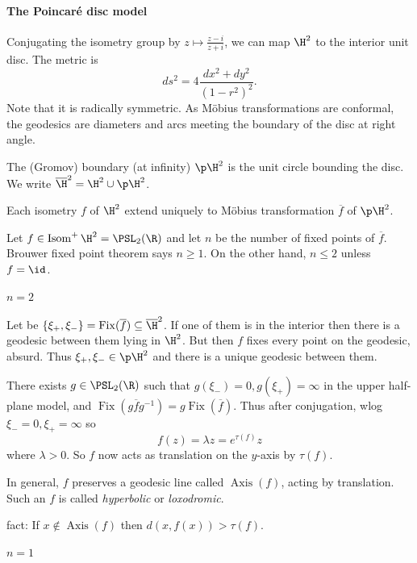 \documentclass[a4paper]{article}
\renewcommand{\b}{\p}
\DeclareMathOperator{\Isom}{Isom}
\DeclareMathOperator{\Fix}{Fix}
\DeclareMathOperator{\Axis}{Axis}
\begin{document}
\paragraph{The Poincaré disc model}

Conjugating the isometry group by \(z \mapsto \frac{z - i}{z + i}\), we can map \(\H^2\) to the interior unit disc. The metric is
\[
  ds^2 = 4 \frac{dx^2 + dy^2}{(1 - r^2)^2}.
\]
Note that it is radically symmetric. As Möbius transformations are conformal, the geodesics are diameters and arcs meeting the boundary of the disc at right angle.

The (Gromov) boundary (at infinity) \(\b \H^2\) is the unit circle bounding the disc. We write \(\overline \H^2 = \H^2 \cup \b \H^2\).

\begin{note}
  Each isometry \(f\) of \(\H^2\) extend uniquely to Möbius transformation \(\overline f\) of \(\b \H^2\).
\end{note}

Let \(f \in \Isom^+ \H^2 = \PSL_2(\R)\) and let \(n\) be the number of fixed points of \(\overline f\). Brouwer fixed point theorem says \(n \geq 1\). On the other hand, \(n \leq 2\) unless \(f = \id\).

\paragraph{\(n = 2\)}

Let be \(\{\xi_+, \xi_-\} = \Fix(\overline f) \subseteq \overline \H^2\). If one of them is in the interior then there is a geodesic between them lying in \(\H^2\). But then \(f\) fixes every point on the geodesic, absurd. Thus \(\xi_+, \xi_- \in \b \H^2\) and there is a unique geodesic between them.

There exists \(g \in \PSL_2(\R)\) such that \(g(\xi_-) = 0, g(\xi_+) = \infty\) in the upper half-plane model, and \(\Fix(g \overline f g^{-1}) = g \Fix(\overline f)\). Thus after conjugation, wlog \(\xi_- = 0, \xi_+ = \infty\) so
\[
  f(z) = \lambda z = e^{\tau(f)} z
\]
where \(\lambda > 0\). So \(f\) now acts as translation on the \(y\)-axis by \(\tau(f)\).

In general, \(f\) preserves a geodesic line called \(\Axis(f)\), acting by translation. Such an \(f\) is called \emph{hyperbolic} or \emph{loxodromic}.

fact: If \(x \notin \Axis(f)\) then \(d(x, f(x)) > \tau(f)\).

\paragraph{\(n = 1\)}
\end{document}
